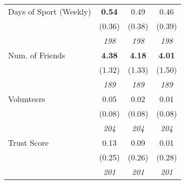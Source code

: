 \begin{tabular}{l c c c}
Days of Sport (Weekly) & \textbf{ 0.54 } & 0.49 & 0.46 \\
& (0.36) & (0.38) & (0.39) \\
& \textit{ 198 } & \textit{ 198 } & \textit{ 198 } \\
Num. of Friends & \textbf{ 4.38 } & \textbf{ 4.18 } & \textbf{ 4.01 } \\
& (1.32) & (1.33) & (1.50) \\
& \textit{ 189 } & \textit{ 189 } & \textit{ 189 } \\
Volunteers & 0.05 & 0.02 & 0.01 \\
& (0.08) & (0.08) & (0.08) \\
& \textit{ 204 } & \textit{ 204 } & \textit{ 204 } \\
Trust Score & 0.13 & 0.09 & 0.01 \\
& (0.25) & (0.26) & (0.28) \\
& \textit{ 201 } & \textit{ 201 } & \textit{ 201 } \\
\bottomrule
\end{tabular}
